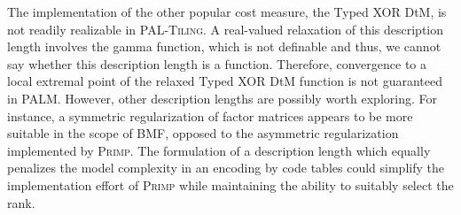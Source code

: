 The implementation of the other popular cost measure, the Typed XOR DtM, is not readily realizable in \textsc{PAL-Tiling}. A real-valued relaxation of this description length involves the gamma function, which is not definable and thus, we cannot say whether this description length is a \KL function. Therefore, convergence to a local extremal point of the relaxed Typed XOR DtM function is not guaranteed in PALM. However, other description lengths are possibly worth exploring. For instance, a symmetric regularization of factor matrices appears to be more suitable in the scope of BMF, opposed to the asymmetric regularization implemented by \textsc{Primp}. The formulation of a description length which equally penalizes the model complexity in an encoding by code tables could simplify the implementation effort of \textsc{Primp} while maintaining the ability to suitably select the rank.
